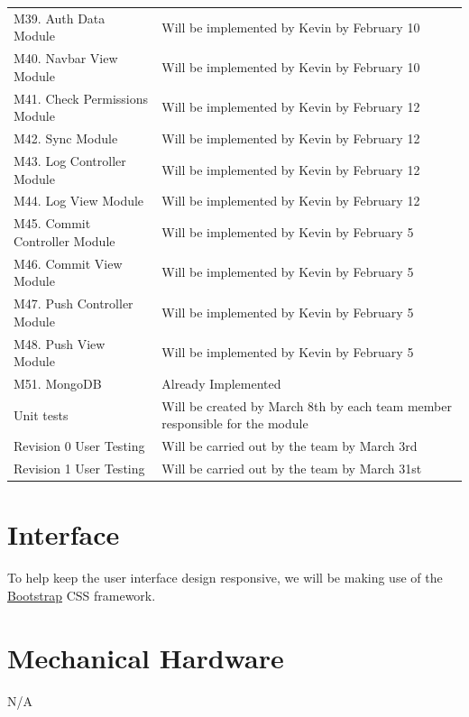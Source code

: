 \documentclass[12pt, titlepage]{article}
\begin{document}
\begin{longtable}{p{} p{}}
		M39. Auth Data Module &  Will be implemented by Kevin by February 10  \\
		M40. Navbar View Module &  Will be implemented by Kevin by February 10  \\
		M41. Check Permissions Module &  Will be implemented by Kevin by February 12  \\
		M42. Sync Module &  Will be implemented by Kevin by February 12  \\
		M43. Log Controller Module &  Will be implemented by Kevin by February 12  \\
		M44. Log View Module &  Will be implemented by Kevin by February 12  \\
		M45. Commit Controller Module &  Will be implemented by Kevin by February 5  \\
		M46. Commit View Module &  Will be implemented by Kevin by February 5  \\
		M47. Push Controller Module &  Will be implemented by Kevin by February 5  \\
		M48. Push View Module &  Will be implemented by Kevin by February 5  \\
		M51. MongoDB &  Already Implemented  \\
		Unit tests &  Will be created by March 8th by each team member responsible for the module  \\
		Revision 0 User Testing &  Will be carried out by the team by March 3rd \\
		Revision 1 User Testing &  Will be carried out by the team by March 31st \\
		\bottomrule
	\end{longtable}
	\normalsize
	
	\newpage{}
	
	\appendix
	
	\section{Interface}
	
	To help keep the user interface design responsive, we will be making use of the \href{https://getbootstrap.com/docs/4.1/getting-started/introduction/}{Bootstrap} CSS framework.
	
	\section{Mechanical Hardware}
	N/A
	
\end{document}
